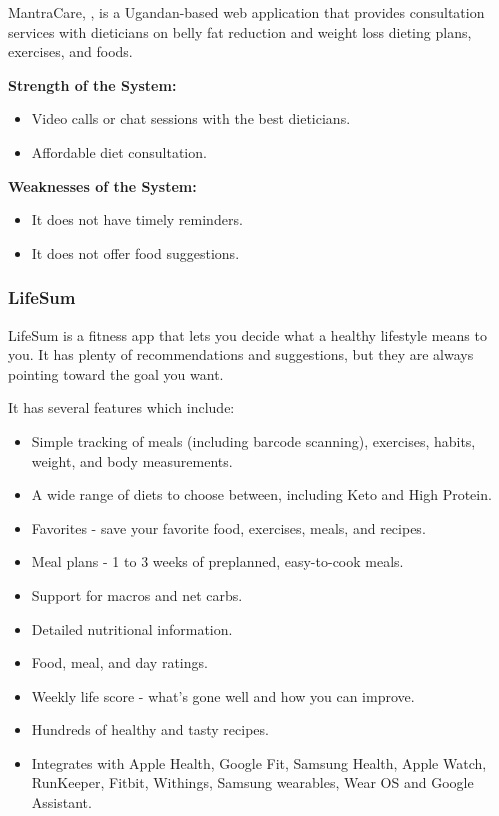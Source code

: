 \documentclass{article}
\begin{document}
MantraCare, \cite{mantracare}, is a Ugandan-based web application that provides consultation services with dieticians on belly fat reduction and weight loss dieting plans, exercises, and foods.

\textbf{Strength of the System:}

\begin{itemize}
\item Video calls or chat sessions with the best dieticians.
\item Affordable diet consultation.
\end{itemize}

\textbf{Weaknesses of the System:}

\begin{itemize}
\item It does not have timely reminders.
\item It does not offer food suggestions.
\end{itemize}
\subsubsection{LifeSum}
LifeSum is a fitness app that lets you decide what a healthy lifestyle means to you. It has plenty of recommendations and suggestions, but they are always pointing toward the goal you want.

It has several features which include:
\begin{itemize}
\item Simple tracking of meals (including barcode scanning), exercises, habits, weight, and body measurements.
\item A wide range of diets to choose between, including Keto and High Protein.
\item Favorites - save your favorite food, exercises, meals, and recipes.
\item Meal plans - 1 to 3 weeks of preplanned, easy-to-cook meals.
\item Support for macros and net carbs.
\item Detailed nutritional information.
\item Food, meal, and day ratings.
\item Weekly life score - what's gone well and how you can improve.
\item Hundreds of healthy and tasty recipes.
\item Integrates with Apple Health, Google Fit, Samsung Health, Apple Watch, RunKeeper, Fitbit, Withings, Samsung wearables, Wear OS and Google Assistant.
\end{itemize}
\end{document}

